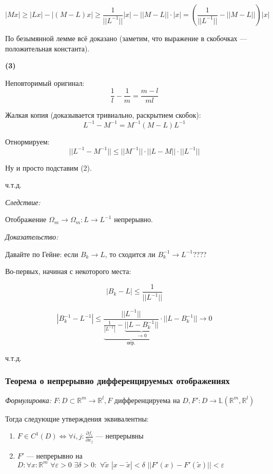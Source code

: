 \documentclass{article}
\def\dbl{\,\,}
\begin{document}
\[|Mx| \ge |Lx| - |(M - L)x| \ge \frac{1}{||L^{-1}||}|x| - ||M - L||\cdot|x| = \left(\frac{1}{||L^{-1}||} - ||M - L||\right)|x|\]

По безымянной лемме всё доказано (заметим, что выражение в скобочках --- положительная константа).

\textbf{(3)}

Неповторимый оригинал:
\[\frac{1}{l} - \frac{1}{m} = \frac{m - l}{ml}\]

Жалкая копия (доказывается тривиально, раскрытием скобок):
\[L^{-1}  - M^{-1} = M^{-1}(M - L)L^{-1}\]

Отнормируем:
\[||L^{-1} - M^{-1}|| \le ||M^{-1}|| \cdot ||L - M|| \cdot ||L^{-1}||\]

Ну и просто подставим (2).

ч.т.д.

\textit{Следствие:}

Отображение $\Omega_m \rightarrow \Omega_m: L \rightarrow L^{-1}$ непрерывно.

\textit{Доказательство:}

Давайте по Гейне: если $B_k \rightarrow L$, то сходится ли $B^{-1}_k \rightarrow L^{-1}$????

Во-первых, начиная с некоторого места:

\[|B_k - L| \le \frac{1}{||L^{-1}||}\]

\[|B^{-1}_k - L^{-1}| \le \frac{||L^{-1}||}{\underbrace{\frac{1}{|L^{-1}|} - \underbrace{||L - B^{-1}_k||}_{\rightarrow 0}}_{\text{огр.}}} \cdot ||L - B^{-1}_k|| \rightarrow 0\]

ч.т.д.


\subsubsection{Теорема о непрерывно дифференцируемых отображениях}
\textit{Формулировка:}
$F: D \subset \mathbb{R}^m \rightarrow \mathbb{R}^l, F$ дифференцируема на $D, F': D \rightarrow \mathbb{L}(\mathbb{R}^m, \mathbb{R}^l)$

Тогда следующие утверждения эквивалентны:

\begin{enumerate}
    \item $F \in C^1(D) \Leftrightarrow \forall i, j: \frac{\partial f_i}{\partial x_j}$ --- непрерывны
    \item $F'$ --- непрерывно на $D: \forall x: \mathbb{R}^m \dbl \forall \varepsilon > 0 \dbl \exists \delta > 0: \dbl \forall \widetilde{x} \dbl |x - \widetilde{x}| < \delta \dbl ||F'(x) - F'(\widetilde{x})|| < \varepsilon$
\end{enumerate}
\end{document}
